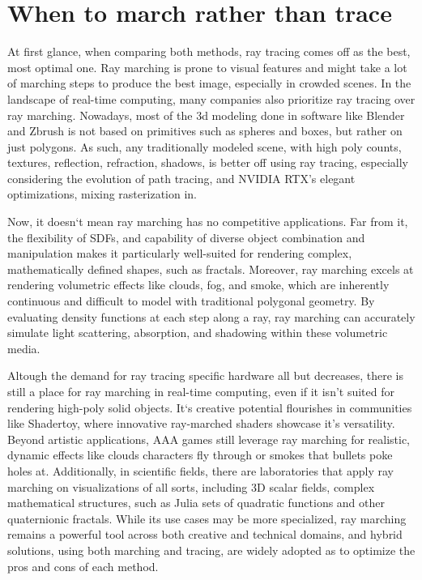 \section{When to march rather than trace}

At first glance, when comparing both methods, ray tracing comes off as the best, most optimal one. Ray marching is prone to visual features and might take a lot of marching steps to produce the best image, especially in crowded scenes. In the landscape of real-time computing, many companies also prioritize ray tracing over ray marching. Nowadays, most of the 3d modeling done in software like Blender and Zbrush is not based on primitives such as spheres and boxes, but rather on just polygons. As such, any traditionally modeled scene, with high poly counts, textures, reflection, refraction, shadows, is better off using ray tracing, especially considering the evolution of path tracing, and NVIDIA RTX's elegant optimizations, mixing rasterization in.

Now, it doesn`t mean ray marching has no competitive applications. Far from it, the flexibility of SDFs, and capability of diverse object combination and manipulation makes it particularly well-suited for rendering complex, mathematically defined shapes, such as fractals. Moreover, ray marching excels at rendering volumetric effects like clouds, fog, and smoke, which are inherently continuous and difficult to model with traditional polygonal geometry. By evaluating density functions at each step along a ray, ray marching can accurately simulate light scattering, absorption, and shadowing within these volumetric media.

Altough the demand for ray tracing specific hardware all but decreases, there is still a place for ray marching in real-time computing, even if it isn’t suited for rendering high-poly solid objects. It`s creative potential flourishes in communities like Shadertoy, where innovative ray-marched shaders showcase it's versatility. Beyond artistic applications, AAA games still leverage ray marching for realistic, dynamic effects like clouds characters fly through or smokes that bullets poke holes at. Additionally, in scientific fields, there are laboratories that apply ray marching on visualizations of all sorts, including 3D scalar fields, complex mathematical structures, such as Julia sets of quadratic functions and other quaternionic fractals. While its use cases may be more specialized, ray marching remains a powerful tool across both creative and technical domains, and hybrid solutions, using both marching and tracing, are widely adopted as to optimize the pros and cons of each method.

